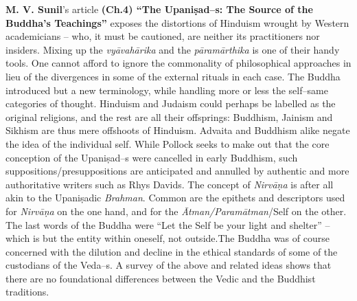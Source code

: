 \textbf{M. V. Sunil}’s article \textbf{(Ch.4) “The Upaniṣad–s: The Source of the Buddha’s Teachings”} exposes the distortions of Hinduism wrought by Western academicians – who, it must be cautioned, are neither its practitioners nor insiders. Mixing up the \textit{vyāvahārika} and the \textit{pāramārthika} is one of their handy tools. One cannot afford to ignore the commonality of philosophical approaches in lieu of the divergences in some of the external rituals in each case. The Buddha introduced but a new terminology, while handling more or less the self–same categories of thought. Hinduism and Judaism could perhaps be labelled as the original religions, and the rest are all their offsprings: Buddhism, Jainism and Sikhism are thus mere offshoots of Hinduism. Advaita and Buddhism alike negate the idea of the individual self. While Pollock seeks to make out that the core conception of the Upaniṣad–s were cancelled in early Buddhism, such suppositions/presuppositions are anticipated and annulled by authentic and more authoritative writers such as Rhys Davids. The concept of \textit{Nirvāṇa} is after all akin to the Upaniṣadic \textit{Brahman}. Common are the epithets and descriptors used for \textit{Nirvāṇa} on the one hand, and for the \textit{Ātman/Paramātman}/Self on the other. The last words of the Buddha were “Let the Self be your light and shelter” – which is but the entity within oneself, not outside.The Buddha was of course concerned with the dilution and decline in the ethical standards of some of the custodians of the Veda–s. A survey of the above and related ideas shows that there are no foundational differences between the Vedic and the Buddhist traditions.

